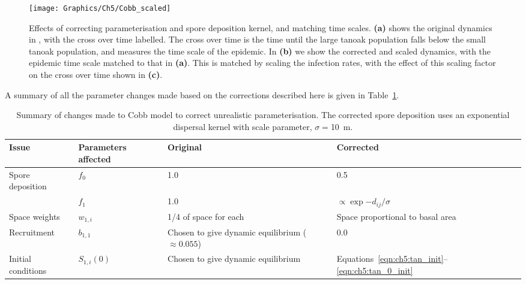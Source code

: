 \begin{figure}[t]
    \begin{center}
        \texttt{[image: Graphics/Ch5/Cobb\_scaled]}
        \caption[Effect of model reparameterisation and infection rate scaling]{Effects of correcting parameterisation and spore deposition kernel, and matching time scales. \textbf{(a)} shows the original dynamics in \citet{cobb_ecosystem_2012}, with the cross over time labelled. The cross over time is the time until the large tanoak population falls below the small tanoak population, and measures the time scale of the epidemic. In \textbf{(b)} we show the corrected and scaled dynamics, with the epidemic time scale matched to that in \textbf{(a)}. This is matched by scaling the infection rates, with the effect of this scaling factor on the cross over time shown in \textbf{(c)}.\label{fig:ch5:inf_scaling}}
    \end{center}
\end{figure}

A summary of all the parameter changes made based on the corrections described here is given in Table~\ref{tab:ch5:param_changes}.

\begin{table}[h]
    \centering
    \caption[Summary of corrections to Cobb model]{Summary of changes made to Cobb model to correct unrealistic parameterisation. The corrected spore deposition uses an exponential dispersal kernel with scale parameter, $\sigma=$\SI{10}{\meter}.\label{tab:ch5:param_changes}}
    \begin{tabular}{@{}lp{2cm}p{4cm}p{3cm}@{}}
        \toprule
        \textbf{Issue} & \textbf{Parameters affected} & \textbf{Original} & \textbf{Corrected} \\
        \midrule
        Spore deposition & $f_0$ & 1.0 & 0.5 \\
        & $f_1$ & 1.0 & $\propto \exp{-d_{ij}/\sigma}$ \\
        \midrule
        Space weights & $w_{1,i}$ & 1/4 of space for each & Space proportional to basal area \\
        \midrule
        Recruitment & $b_{1,1}$ & Chosen to give dynamic equilibrium ($\approx{}0.055$) & 0.0 \\
        \midrule
        Initial conditions & $S_{1,i}(0)$ & Chosen to give dynamic equilibrium & Equations~\ref{eqn:ch5:tan_init}--\ref{eqn:ch5:tan_0_init} \\
        \bottomrule
    \end{tabular}
    \end{table}

